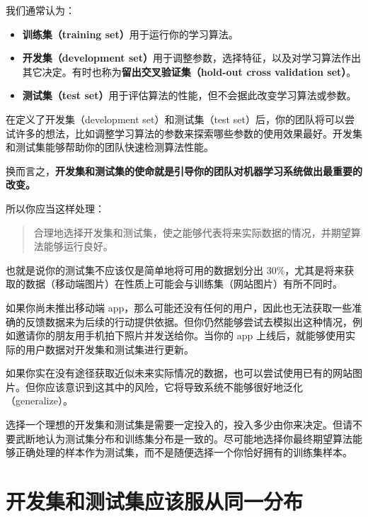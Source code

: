 我们通常认为：

\begin{itemize}
\item
  \textbf{训练集（training set）}用于运行你的学习算法。
\item
  \textbf{开发集（development
  set）}用于调整参数，选择特征，以及对学习算法作出其它决定。有时也称为\textbf{留出交叉验证集（hold-out
  cross validation set）}。
\item
  \textbf{测试集（test
  set）}用于评估算法的性能，但不会据此改变学习算法或参数。
\end{itemize}

在定义了开发集（development set）和测试集（test
set）后，你的团队将可以尝试许多的想法，比如调整学习算法的参数来探索哪些参数的使用效果最好。开发集和测试集能够帮助你的团队快速检测算法性能。

换而言之，\textbf{开发集和测试集的使命就是引导你的团队对机器学习系统做出最重要的改变。}

所以你应当这样处理：

\begin{quote}
合理地选择开发集和测试集，使之能够代表将来实际数据的情况，并期望算法能够运行良好。
\end{quote}

也就是说你的测试集不应该仅是简单地将可用的数据划分出
30\%，尤其是将来获取的数据（移动端图片）在性质上可能会与训练集（网站图片）有所不同时。

如果你尚未推出移动端
app，那么可能还没有任何的用户，因此也无法获取一些准确的反馈数据来为后续的行动提供依据。但你仍然能够尝试去模拟出这种情况，例如邀请你的朋友用手机拍下照片并发送给你。当你的
app 上线后，就能够使用实际的用户数据对开发集和测试集进行更新。

如果你实在没有途径获取近似未来实际情况的数据，也可以尝试使用已有的网站图片。但你应该意识到这其中的风险，它将导致系统不能够很好地泛化（generalize）。

选择一个理想的开发集和测试集是需要一定投入的，投入多少由你来决定。但请不要武断地认为测试集分布和训练集分布是一致的。尽可能地选择你最终期望算法能够正确处理的样本作为测试集，而不是随便选择一个你恰好拥有的训练集样本。

\hypertarget{ux5f00ux53d1ux96c6ux548cux6d4bux8bd5ux96c6ux5e94ux8be5ux670dux4eceux540cux4e00ux5206ux5e03}{%
\chapter{开发集和测试集应该服从同一分布}\label{ux5f00ux53d1ux96c6ux548cux6d4bux8bd5ux96c6ux5e94ux8be5ux670dux4eceux540cux4e00ux5206ux5e03}}

